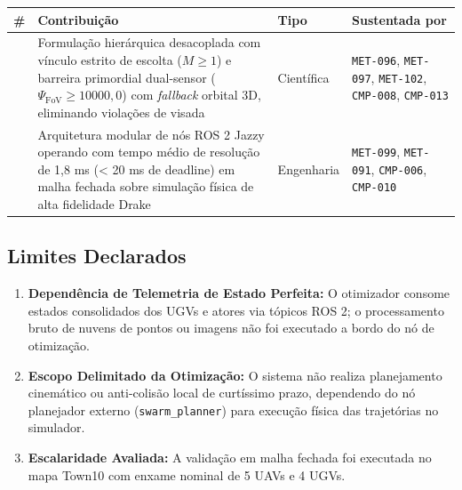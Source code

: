 \documentclass[
  brazilian,
  a4paper]{article}
\newcounter{none} %
\providecommand{\tightlist}{%
  \setlength{\itemsep}{0pt}\setlength{\parskip}{0pt}}
\begin{document}
{\def\LTcaptype{none} %
\begin{longtable}[]{@{}
  >{\raggedright\arraybackslash}p{}
  >{\raggedright\arraybackslash}p{}
  >{\raggedright\arraybackslash}p{}
  >{\raggedright\arraybackslash}p{}@{}}
\toprule\noalign{}
\begin{minipage}[b]{\linewidth}\raggedright
\#
\end{minipage} & \begin{minipage}[b]{\linewidth}\raggedright
Contribuição
\end{minipage} & \begin{minipage}[b]{\linewidth}\raggedright
Tipo
\end{minipage} & \begin{minipage}[b]{\linewidth}\raggedright
Sustentada por
\end{minipage} \\
\midrule\noalign{}
\endhead
\bottomrule\noalign{}
\endlastfoot
1 & Formulação hierárquica desacoplada com vínculo estrito de escolta
(\(M \ge 1\)) e barreira primordial dual-sensor
(\(\Psi_{\text{FoV}} \ge 10000{,}0\)) com \emph{fallback} orbital 3D,
eliminando violações de visada & Científica & \texttt{MET-096},
\texttt{MET-097}, \texttt{MET-102}, \texttt{CMP-008},
\texttt{CMP-013} \\
2 & Arquitetura modular de nós ROS 2 Jazzy operando com tempo médio de
resolução de 1,8 ms (\textless{} 20 ms de deadline) em malha fechada
sobre simulação física de alta fidelidade Drake & Engenharia &
\texttt{MET-099}, \texttt{MET-091}, \texttt{CMP-006},
\texttt{CMP-010} \\
\end{longtable}
}

\subsection{Limites Declarados}\label{limites-declarados}

\begin{enumerate}
\def\labelenumi{\arabic{enumi}.}
\tightlist
\item
  \textbf{Dependência de Telemetria de Estado Perfeita:} O otimizador
  consome estados consolidados dos UGVs e atores via tópicos ROS 2; o
  processamento bruto de nuvens de pontos ou imagens não foi executado a
  bordo do nó de otimização.
\item
  \textbf{Escopo Delimitado da Otimização:} O sistema não realiza
  planejamento cinemático ou anti-colisão local de curtíssimo prazo,
  dependendo do nó planejador externo (\texttt{swarm\_\allowbreak{}planner}) para
  execução física das trajetórias no simulador.
\item
  \textbf{Escalaridade Avaliada:} A validação em malha fechada foi
  executada no mapa Town10 com enxame nominal de 5 UAVs e 4 UGVs.
\end{enumerate}
\end{document}
